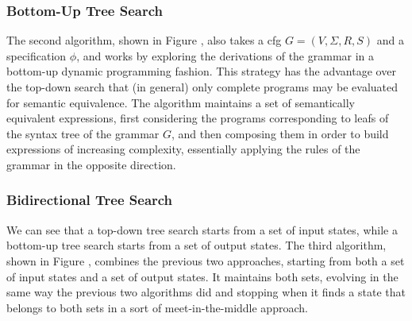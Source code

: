 
\subsubsection{Bottom-Up Tree Search}
\label{sec:bottom-up-tree-search}

The second algorithm, shown in Figure , also takes a \gls{cfg} $G = (V, \Sigma{}, R, S)$ and a specification
$\phi{}$, and works by exploring the derivations of the grammar in a bottom-up
dynamic programming fashion. This strategy has the advantage over the top-down
search that (in general) only complete programs may be evaluated for semantic
equivalence. The algorithm maintains a set of semantically equivalent
expressions, first considering the programs corresponding to leafs of the syntax
tree of the grammar $G$, and then composing them in order to build expressions
of increasing complexity, essentially applying the rules of the grammar in the
opposite direction.



\subsubsection{Bidirectional Tree Search}
\label{sec:bidirectional-search}

We can see that a top-down tree search starts from a set of input states, while
a bottom-up tree search starts from a set of output states. The third algorithm,
shown in Figure , combines the
previous two approaches, starting from both a set of input states and a set of
output states. It maintains both sets, evolving in the same way the previous two
algorithms did and stopping when it finds a state that belongs to both sets in a
sort of meet-in-the-middle approach.

